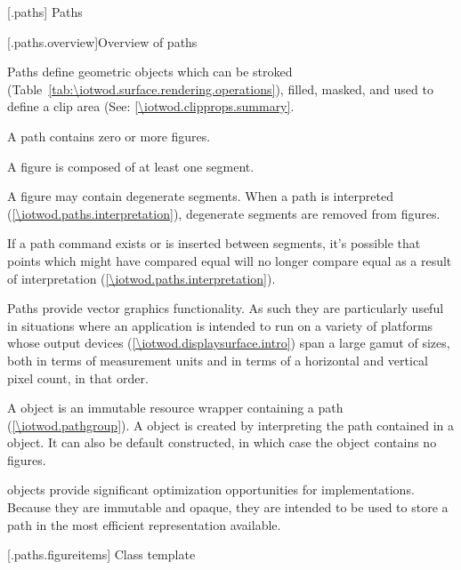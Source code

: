 
 [\iotwod.paths] {Paths}

 [\iotwod.paths.overview]{Overview of paths}

\pnum
Paths define geometric objects which can be stroked (Table~\ref{tab:\iotwod.surface.rendering.operations}), filled, masked, and used to define a clip area (See: \ref{\iotwod.clipprops.summary}.

\pnum
A path contains zero or more figures.

\pnum
A figure is composed of at least one segment.

\pnum
A figure may contain degenerate segments. When a path is interpreted (\ref{\iotwod.paths.interpretation}), degenerate segments are removed from figures.
\begin{note}
If a path command exists or is inserted between segments, it's possible that points which might have compared equal will no longer compare equal as a result of interpretation (\ref{\iotwod.paths.interpretation}).
\end{note}

\pnum
Paths provide vector graphics functionality. As such they are particularly useful in situations where an application is intended to run on a variety of platforms whose output devices (\ref{\iotwod.displaysurface.intro}) span a large gamut of sizes, both in terms of measurement units and in terms of a horizontal and vertical pixel count, in that order.

\pnum
A  object is an immutable resource wrapper containing a path (\ref{\iotwod.pathgroup}). A  object is created by interpreting the path contained in a  object. It can also be default constructed, in which case the  object contains no figures.
\begin{note}
 objects provide significant optimization opportunities for implementations. Because they are immutable and opaque, they are intended to be used to store a path in the most efficient representation available.
\end{note}



 [\iotwod.paths.figureitems] {Class template }

\addtocounter{SectionDepthBase}{2}















\addtocounter{SectionDepthBase}{-2}

\addtocounter{SectionDepthBase}{1}


\addtocounter{SectionDepthBase}{-1}
